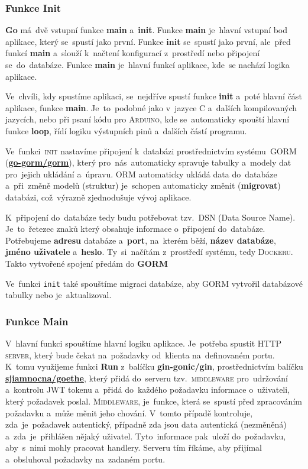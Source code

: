 \documentclass[14pt,a4paper]{article}
\begin{document}
            \subsubsection{Funkce Init}
            \textbf{Go} má~dvě vstupní funkce \textbf{main} a~\textbf{init}. Funkce \textbf{main} je~hlavní vstupní bod aplikace, který se~spustí jako první. Funkce \textbf{init} se~spustí jako první, ale~před funkcí \textbf{main} a~slouží k~načtení konfigurací z~prostředí nebo připojení se~do~databáze. Funkce \textbf{main} je~hlavní funkcí aplikace, kde~se nachází logika aplikace.

            Ve~chvíli, kdy spustíme aplikaci, se~nejdříve spustí funkce \textbf{init} a~poté hlavní část aplikace, funkce \textbf{main}. Je~to~podobné jako v~jazyce C a~dalších kompilovaných jazycích, nebo při psaní kódu pro \textsc{Arduino}, kde se~automaticky spouští hlavní funkce \textbf{loop}, řídí logiku výstupních pinů a~dalších částí programu.
            
            Ve~funkci~\textsc{init} nastavíme připojení k~databázi prostřednictvím systému~\textsc{GORM} (\href{https://gorm.io/}{\textbf{go-gorm/gorm}}), který pro~nás~automaticky spravuje tabulky a~modely dat pro~jejich ukládání a~úpravu. \textsc{ORM} automaticky ukládá data do~databáze a~při~změně modelů (struktur) je~schopen automaticky změnit (\textbf{migrovat}) databázi, což~výrazně zjednodušuje vývoj aplikace.

            K~připojení do~databáze tedy budu potřebovat tzv.~\textsc{DSN} (Data Source Name). Je~to~řetezec znaků který obsahuje informace o~připojení do~databáze. Potřebujeme \textbf{adresu} databáze a~\textbf{port}, na~kterém běží, \textbf{název databáze}, \textbf{jméno uživatele} a~\textbf{heslo}. Ty~si~načítám z~prostředí systému, tedy \textsc{Dockeru}. Takto vytvořené spojení předám do \textbf{GORM}

            Ve~funkci \texttt{init} také spouštíme migraci databáze, aby \textsc{GORM} vytvořil databázové tabulky nebo je~aktualizoval.


            \subsubsection{Funkce Main}
            V~hlavní funkci spouštíme hlavní logiku aplikace. Je~potřeba spustit \textsc{HTTP server}, který bude čekat na~požadavky od~klienta na~definovaném portu. K~tomu využijeme funkci \textbf{Run} z~balíčku \textbf{gin-gonic/gin}, prostřednictvím balíčku \href{https://gitlab.com/sjiamnocna/goethe}{\textbf{sjiamnocna/goethe}}, který přidá do~serveru tzv.~\textsc{middleware} pro~udržování a~kontrolu \textsc{JWT} tokenu a~přidá do~každého požadavku informace o~uživateli, který požadavek poslal. \textsc{Middleware}, je~funkce, která se~spustí před zpracováním požadavku a~může měnit jeho chování. V~tomto případě kontroluje, zda~je~požadavek autentický, případně zda jsou data autentická (nezměněná) a~zda~je~přihlášen nějaký uživatel. Tyto~informace pak~uloží do~požadavku, aby~s~nimi mohly pracovat handlery. Serveru tím říkáme, aby přijímal a~obsluhoval požadavky na~zadaném portu.
\end{document}

